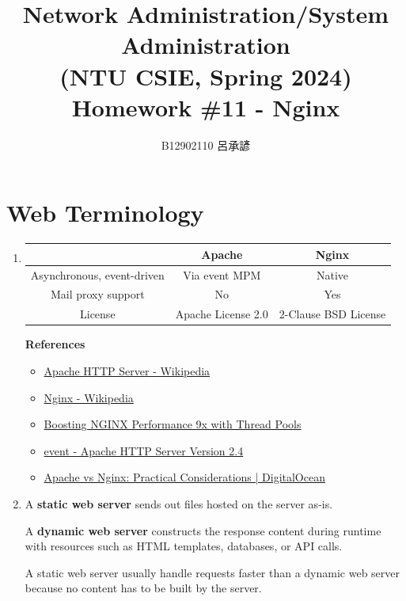 \documentclass[12pt, a4paper]{article}
\title{
  \vspace{-1cm}
  Network Administration/System Administration\\
  (NTU CSIE, Spring 2024)\\
  Homework \#11 - Nginx
}
\author{\Large B12902110 呂承諺}
\begin{document}
  \maketitle

  \section*{Web Terminology}
  \begin{enumerate}
    \item \phantom{}\vspace{-\baselineskip}

    \begin{tabular}{|c|c|c|}
      \hline
      & \textbf{Apache} & \textbf{Nginx} \\\hline
      Asynchronous, event-driven & Via event MPM & Native \\\hline
      Mail proxy support & No & Yes \\\hline
      License & Apache License 2.0 & 2-Clause BSD License \\\hline
    \end{tabular}
    \vspace{\baselineskip}

    \textbf{References}
    \begin{itemize}
      \item \href{https://en.wikipedia.org/wiki/Apache_HTTP_Server}{Apache HTTP Server - Wikipedia}
      \item \href{https://en.wikipedia.org/wiki/Nginx}{Nginx - Wikipedia}
      \item \href{https://www.nginx.com/blog/thread-pools-boost-performance-9x/}{Boosting NGINX Performance 9x with Thread Pools}
      \item \href{https://httpd.apache.org/docs/2.4/mod/event.html}{event - Apache HTTP Server Version 2.4}
      \item \href{https://www.digitalocean.com/community/tutorials/apache-vs-nginx-practical-considerations}{Apache vs Nginx: Practical Considerations  | DigitalOcean}
    \end{itemize}

    \item A \textbf{static web server} sends out files hosted on the server as-is.

    A \textbf{dynamic web server} constructs the response content during runtime with
    resources such as HTML templates, databases, or API calls.

    A static web server usually handle requests faster than a dynamic web server
    because no content has to be built by the server.


\end{enumerate}
\end{document}

